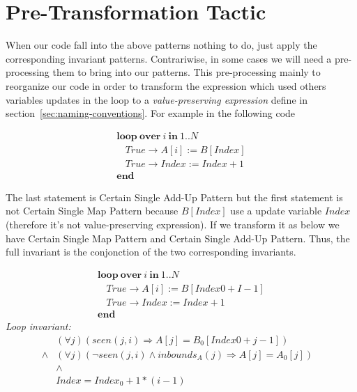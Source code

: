 \documentclass[a4paper,10pt]{article}
\newcommand{\idx}{\ensuremath{i}\xspace}
\newcommand{\KWloop}{\ensuremath{\mathrm{\textbf{loop}}~}}
\newcommand{\KWend}{\ensuremath{\mathrm{\textbf{end}}}}
\newcommand{\KWover}{\ensuremath{\mathrm{\textbf{over}}~}}
\newcommand{\KWin}{\ensuremath{~\mathrm{\textbf{in}}~}}
\newcommand{\inbounds}[2]{\ensuremath{\mathit{inbounds}_{#1}(#2)}\xspace}
\newcommand{\seen}[2]{\ensuremath{\mathit{seen}{(#1,#2)}}\xspace}
\newcommand{\loopinvariant}{\noindent\textit{Loop invariant:}\xspace}
\newcommand{\impl}{\ensuremath{\Longrightarrow}}
\begin{document}
\section{Pre-Transformation Tactic}
When our code fall into the above patterns nothing to do, just apply the corresponding invariant patterns. 
Contrariwise, in some cases we will need a pre-processing them to bring into our patterns. 
This pre-processing mainly to reorganize our code in order to transform the expression 
which used others variables updates in the loop to a \textit{value-preserving expression}  
define in section~\ref{sec:naming-conventions}. For example in the following code 

$$\begin{array}{l}
  \KWloop \KWover i \KWin 1 .. N \\
  ~~~~ True \rightarrow A[i] := B[Index]\\
  ~~~~ True \rightarrow Index := Index + 1\\
  \KWend
\end{array}$$

The last statement is Certain Single Add-Up Pattern but the first statement is not Certain Single Map Pattern
because $B[Index]$ use a update variable $Index$ (therefore it's not value-preserving expression). 
If we transform it as below we have Certain Single Map Pattern and Certain Single Add-Up Pattern. 
Thus, the full invariant is the conjonction of the two corresponding invariants.

$$\begin{array}{l}
  \KWloop \KWover i \KWin 1 .. N \\
  ~~~~ True \rightarrow A[i]   := B[Index0 + I-1]\\
  ~~~~ True \rightarrow Index := Index + 1\\
  \KWend
\end{array}$$
%
\loopinvariant
%
\begin{eqnarray*}
&(\forall j)(\seen{j}{\idx} \impl A[j] = B_0[Index0 + j-1]) \\
\land& (\forall j)(\neg \seen{j}{\idx} \land \inbounds{A}{j} \impl A[j] = A_0[j])\\
&\land& \\
&Index = Index_0 + 1 * (i-1)&
\end{eqnarray*}

\end{document}
